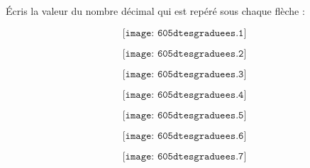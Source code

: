 \par\'Ecris la valeur du nombre décimal qui est repéré sous chaque flèche :
\begin{multicols}{2}
\begin{myenumerate}
\item\[\texttt{[image: 605dtesgraduees.1]}\]
\item\[\texttt{[image: 605dtesgraduees.2]}\]
\item\[\texttt{[image: 605dtesgraduees.3]}\]
\item\[\texttt{[image: 605dtesgraduees.4]}\]
\item\[\texttt{[image: 605dtesgraduees.5]}\]
\item\[\texttt{[image: 605dtesgraduees.6]}\]
\item\[\texttt{[image: 605dtesgraduees.7]}\]
\end{myenumerate}
\end{multicols}
